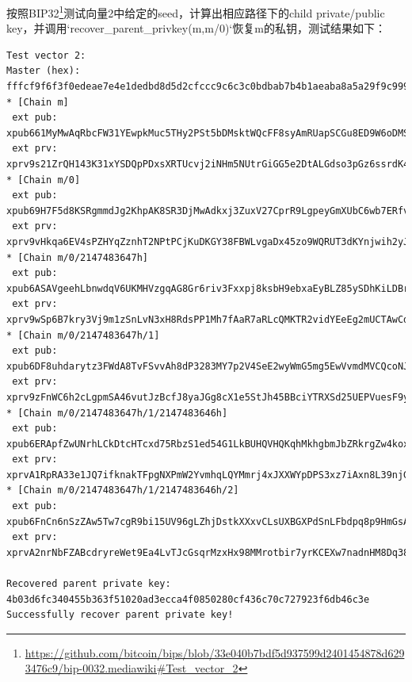 按照BIP32\footnote{\url{https://github.com/bitcoin/bips/blob/33e040b7bdf5d937599d2401454878d6293476c9/bip-0032.mediawiki\#Test_vector_2}}测试向量2中给定的seed，计算出相应路径下的child private/public key，并调用`recover_parent_privkey(m,m/0)`恢复m的私钥，测试结果如下：

\begin{lstlisting}
Test vector 2:
Master (hex): fffcf9f6f3f0edeae7e4e1dedbd8d5d2cfccc9c6c3c0bdbab7b4b1aeaba8a5a29f9c999693908d8a8784817e7b7875726f6c696663605d5a5754514e4b484542
* [Chain m]
 ext pub: xpub661MyMwAqRbcFW31YEwpkMuc5THy2PSt5bDMsktWQcFF8syAmRUapSCGu8ED9W6oDMSgv6Zz8idoc4a6mr8BDzTJY47LJhkJ8UB7WEGuduB
 ext prv: xprv9s21ZrQH143K31xYSDQpPDxsXRTUcvj2iNHm5NUtrGiGG5e2DtALGdso3pGz6ssrdK4PFmM8NSpSBHNqPqm55Qn3LqFtT2emdEXVYsCzC2U
* [Chain m/0]
 ext pub: xpub69H7F5d8KSRgmmdJg2KhpAK8SR3DjMwAdkxj3ZuxV27CprR9LgpeyGmXUbC6wb7ERfvrnKZjXoUmmDznezpbZb7ap6r1D3tgFxHmwMkQTPH
 ext prv: xprv9vHkqa6EV4sPZHYqZznhT2NPtPCjKuDKGY38FBWLvgaDx45zo9WQRUT3dKYnjwih2yJD9mkrocEZXo1ex8G81dwSM1fwqWpWkeS3v86pgKt
* [Chain m/0/2147483647h]
 ext pub: xpub6ASAVgeehLbnwdqV6UKMHVzgqAG8Gr6riv3Fxxpj8ksbH9ebxaEyBLZ85ySDhKiLDBrQSARLq1uNRts8RuJiHjaDMBU4Zn9h8LZNnBC5y4a
 ext prv: xprv9wSp6B7kry3Vj9m1zSnLvN3xH8RdsPP1Mh7fAaR7aRLcQMKTR2vidYEeEg2mUCTAwCd6vnxVrcjfy2kRgVsFawNzmjuHc2YmYRmagcEPdU9
* [Chain m/0/2147483647h/1]
 ext pub: xpub6DF8uhdarytz3FWdA8TvFSvvAh8dP3283MY7p2V4SeE2wyWmG5mg5EwVvmdMVCQcoNJxGoWaU9DCWh89LojfZ537wTfunKau47EL2dhHKon
 ext prv: xprv9zFnWC6h2cLgpmSA46vutJzBcfJ8yaJGg8cX1e5StJh45BBciYTRXSd25UEPVuesF9yog62tGAQtHjXajPPdbRCHuWS6T8XA2ECKADdw4Ef
* [Chain m/0/2147483647h/1/2147483646h]
 ext pub: xpub6ERApfZwUNrhLCkDtcHTcxd75RbzS1ed54G1LkBUHQVHQKqhMkhgbmJbZRkrgZw4koxb5JaHWkY4ALHY2grBGRjaDMzQLcgJvLJuZZvRcEL
 ext prv: xprvA1RpRA33e1JQ7ifknakTFpgNXPmW2YvmhqLQYMmrj4xJXXWYpDPS3xz7iAxn8L39njGVyuoseXzU6rcxFLJ8HFsTjSyQbLYnMpCqE2VbFWc
* [Chain m/0/2147483647h/1/2147483646h/2]
 ext pub: xpub6FnCn6nSzZAw5Tw7cgR9bi15UV96gLZhjDstkXXxvCLsUXBGXPdSnLFbdpq8p9HmGsApME5hQTZ3emM2rnY5agb9rXpVGyy3bdW6EEgAtqt
 ext prv: xprvA2nrNbFZABcdryreWet9Ea4LvTJcGsqrMzxHx98MMrotbir7yrKCEXw7nadnHM8Dq38EGfSh6dqA9QWTyefMLEcBYJUuekgW4BYPJcr9E7j

Recovered parent private key: 4b03d6fc340455b363f51020ad3ecca4f0850280cf436c70c727923f6db46c3e
Successfully recover parent private key!
\end{lstlisting}


